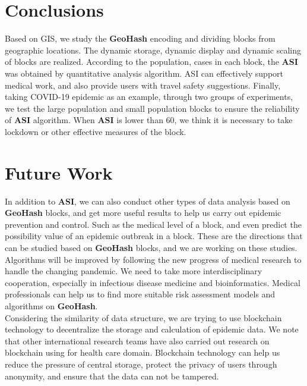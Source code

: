 \documentclass[sigplan,screen]{acmart}
\begin{document}
\section{Conclusions}
Based on GIS, we study the \textbf{GeoHash} encoding and dividing blocks from geographic locations.
The dynamic storage, dynamic display and dynamic scaling of blocks are realized.
According to the population, cases in each block, the \textbf{ASI} was obtained by quantitative analysis algorithm.
ASI can effectively support medical work, and also provide users with travel safety suggestions.
Finally, taking COVID-19 epidemic as an example, through two groups of experiments, we test the large population and small population blocks to ensure the reliability of \textbf{ASI} algorithm.
When \textbf{ASI} is lower than 60, we think it is necessary to take lockdown or other effective measures of the block.
\section{Future Work}
In addition to \textbf{ASI}, we can also conduct other types of data analysis based on \textbf{GeoHash} blocks, and get more useful results to help us carry out epidemic prevention and control.
Such as the medical level of a block, and even predict the possibility value of an epidemic outbreak in a block.
These are the directions that can be studied based on \textbf{GeoHash} blocks, and we are working on these studies.
\\
Algorithms will be improved by following the new progress of medical research to handle the changing pandemic.
We need to take more interdisciplinary cooperation, especially in infectious disease medicine and bioinformatics.
Medical professionals can help us to find more suitable risk assessment models and algorithms on \textbf{GeoHash}.
\\
Considering the similarity of data structure, we are trying to use blockchain technology to decentralize the storage and calculation of epidemic data.
We note that other international research teams have also carried out research on blockchain using for health care domain.\cite{nguyen_ding_pathirana_seneviratne_2020}\cite{CryptocurrencyNewUse2020Coronavirus}
Blockchain technology can help us reduce the pressure of central storage, protect the privacy of users through anonymity\cite{nakamoto2019bitcoin}, and ensure that the data can not be tampered.\cite{armstrong2016move}


\end{document}
